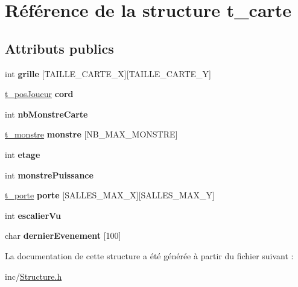 \hypertarget{structt__carte}{}\section{Référence de la structure t\+\_\+carte}
\label{structt__carte}
\subsection*{Attributs publics}
\begin{DoxyCompactItemize}
\item 
\hypertarget{structt__carte_a6a09f097caa9a01fd09cec436910e4ea}{}int {\bfseries grille} \mbox{[}T\+A\+I\+L\+L\+E\+\_\+\+C\+A\+R\+T\+E\+\_\+\+X\mbox{]}\mbox{[}T\+A\+I\+L\+L\+E\+\_\+\+C\+A\+R\+T\+E\+\_\+\+Y\mbox{]}\label{structt__carte_a6a09f097caa9a01fd09cec436910e4ea}

\item 
\hypertarget{structt__carte_aa6409295c44719e88fb7c379158434bc}{}\hyperlink{structt__posJoueur}{t\+\_\+pos\+Joueur} {\bfseries cord}\label{structt__carte_aa6409295c44719e88fb7c379158434bc}

\item 
\hypertarget{structt__carte_aed27e9a572a18fa7f3539176545df9c0}{}int {\bfseries nb\+Monstre\+Carte}\label{structt__carte_aed27e9a572a18fa7f3539176545df9c0}

\item 
\hypertarget{structt__carte_abb48211cb9bf855a794d88851a66d1fc}{}\hyperlink{structt__monstre}{t\+\_\+monstre} {\bfseries monstre} \mbox{[}N\+B\+\_\+\+M\+A\+X\+\_\+\+M\+O\+N\+S\+T\+R\+E\mbox{]}\label{structt__carte_abb48211cb9bf855a794d88851a66d1fc}

\item 
\hypertarget{structt__carte_a3ef31c7ef8b31997a5913043fc7fec3d}{}int {\bfseries etage}\label{structt__carte_a3ef31c7ef8b31997a5913043fc7fec3d}

\item 
\hypertarget{structt__carte_ad741f2b2b699afb30a9feae904ba1d31}{}int {\bfseries monstre\+Puissance}\label{structt__carte_ad741f2b2b699afb30a9feae904ba1d31}

\item 
\hypertarget{structt__carte_adb7aebf442be05fe060920b8d5bc5685}{}\hyperlink{structt__porte}{t\+\_\+porte} {\bfseries porte} \mbox{[}S\+A\+L\+L\+E\+S\+\_\+\+M\+A\+X\+\_\+\+X\mbox{]}\mbox{[}S\+A\+L\+L\+E\+S\+\_\+\+M\+A\+X\+\_\+\+Y\mbox{]}\label{structt__carte_adb7aebf442be05fe060920b8d5bc5685}

\item 
\hypertarget{structt__carte_ab964622380c058348496de5ea3d409c9}{}int {\bfseries escalier\+Vu}\label{structt__carte_ab964622380c058348496de5ea3d409c9}

\item 
\hypertarget{structt__carte_a2459420de06f3193340f5e8ac0c8282b}{}char {\bfseries dernier\+Evenement} \mbox{[}100\mbox{]}\label{structt__carte_a2459420de06f3193340f5e8ac0c8282b}

\end{DoxyCompactItemize}


La documentation de cette structure a été générée à partir du fichier suivant \+:\begin{DoxyCompactItemize}
\item 
inc/\hyperlink{Structure_8h}{Structure.\+h}\end{DoxyCompactItemize}
